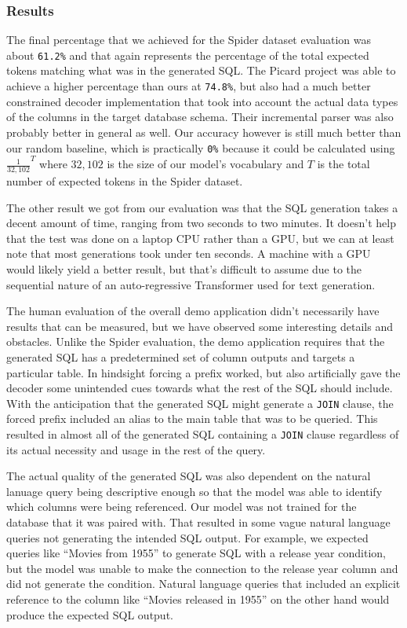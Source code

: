 \documentclass[11pt]{article}
\begin{document}
\subsubsection{Results}

The final percentage that we achieved for the Spider dataset evaluation was about \texttt{61.2\%} and that again represents the percentage of the total expected tokens matching what was in the generated SQL. The Picard project was able to achieve a higher percentage than ours at \texttt{74.8\%}, but also had a much better constrained decoder implementation that took into account the actual data types of the columns in the target database schema. Their incremental parser was also probably better in general as well. Our accuracy however is still much better than our random baseline, which is practically \texttt{0\%} because it could be calculated using $\frac{1}{32,102}^{T}$ where $32,102$ is the size of our model's vocabulary and $T$ is the total number of expected tokens in the Spider dataset.

The other result we got from our evaluation was that the SQL generation takes a decent amount of time, ranging from two seconds to two minutes. It doesn't help that the test was done on a laptop CPU rather than a GPU, but we can at least note that most generations took under ten seconds. A machine with a GPU would likely yield a better result, but that's difficult to assume due to the sequential nature of an auto-regressive Transformer used for text generation.

The human evaluation of the overall demo application didn't necessarily have results that can be measured, but we have observed some interesting details and obstacles. Unlike the Spider evaluation, the demo application requires that the generated SQL has a predetermined set of column outputs and targets a particular table. In hindsight forcing a prefix worked, but also artificially gave the decoder some unintended cues towards what the rest of the SQL should include. With the anticipation that the generated SQL might generate a \texttt{JOIN} clause, the forced prefix included an alias to the main table that was to be queried. This resulted in almost all of the generated SQL containing a \texttt{JOIN} clause regardless of its actual necessity and usage in the rest of the query.

The actual quality of the generated SQL was also dependent on the natural lanuage query being descriptive enough so that the model was able to identify which columns were being referenced. Our model was not trained for the database that it was paired with. That resulted in some vague natural language queries not generating the intended SQL output. For example, we expected queries like ``Movies from 1955'' to generate SQL with a release year condition, but the model was unable to make the connection to the release year column and did not generate the condition. Natural language queries that included an explicit reference to the column like ``Movies released in 1955'' on the other hand would produce the expected SQL output.
\end{document}
